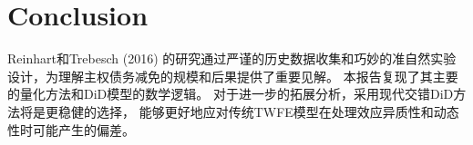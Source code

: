\chapter{Conclusion}
\label{chapter:conclusion}

Reinhart和Trebesch (2016) 的研究通过严谨的历史数据收集和巧妙的准自然实验设计，为理解主权债务减免的规模和后果提供了重要见解。
本报告复现了其主要的量化方法和DiD模型的数学逻辑。
对于进一步的拓展分析，采用现代交错DiD方法将是更稳健的选择，
能够更好地应对传统TWFE模型在处理效应异质性和动态性时可能产生的偏差。